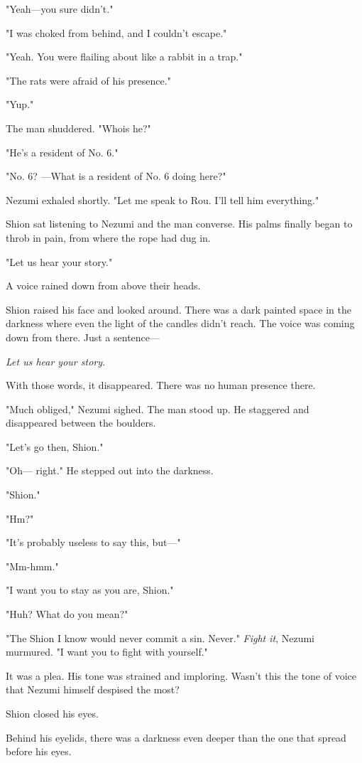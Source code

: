 "Yeah---you sure didn't."

"I was choked from behind, and I couldn't escape."

"Yeah. You were flailing about like a rabbit in a trap."

"The rats were afraid of his presence."

"Yup."

The man shuddered. "Who\el is he?"

"He's a resident of No. 6."

"No. 6? ---What is a resident of No. 6 doing here?"

Nezumi exhaled shortly. "Let me speak to Rou. I'll tell him everything."

Shion sat listening to Nezumi and the man converse. His palms finally
began to throb in pain, from where the rope had dug in.

"Let us hear your story."

A voice rained down from above their heads.

Shion raised his face and looked around. There was a dark painted space
in the darkness where even the light of the candles didn't reach. The
voice was coming down from there. Just a sentence---

\emph{Let us hear your story.}

With those words, it disappeared. There was no human presence there.

"Much obliged," Nezumi sighed. The man stood up. He staggered and
disappeared between the boulders.

"Let's go then, Shion."

"Oh--- right." He stepped out into the darkness.

"Shion."

"Hm?"

"It's probably useless to say this, but---"

"Mm-hmm."

"I want you to stay as you are, Shion."

"Huh? What do you mean?"

"The Shion I know would never commit a sin. Never." \emph{Fight it}, Nezumi
murmured. "I want you to fight with yourself."

It was a plea. His tone was strained and imploring. Wasn't this the tone
of voice that Nezumi himself despised the most?

Shion closed his eyes.

Behind his eyelids, there was a darkness even deeper than the one that
spread before his eyes.